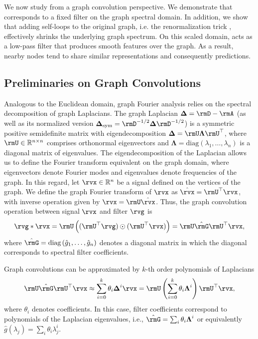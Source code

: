\label{sec:analysis}
We now study \method{} from a graph convolution perspective. We demonstrate that \method{} corresponds to a fixed filter on the graph spectral domain. 
In addition, we show that adding self-loops to the original graph, i.e. the renormalization trick \citep{gcn}, effectively shrinks the underlying graph spectrum.
On this scaled domain, \method{} acts as a low-pass filter that produces smooth features over the graph. As a result, nearby nodes tend to share similar representations and consequently predictions.


\subsection{Preliminaries on Graph Convolutions}
Analogous to the Euclidean domain, graph Fourier analysis relies on the spectral decomposition of graph Laplacians. The graph Laplacian $\boldsymbol{\Delta} = \rmD - \rmA$ (as well as its normalized version $\boldsymbol{\Delta}_{\text{sym}} = \rmD^{-1/2}\boldsymbol{\Delta} \rmD^{-1/2}$) is a symmetric positive semidefinite matrix with eigendecomposition $\boldsymbol{\Delta} = \rmU \boldsymbol{\Lambda} \rmU^{\top}$, where $\rmU \in \mathbb{R}^{n \times n}$ comprises orthonormal eigenvectors and $\boldsymbol{\Lambda} = \text{diag}(\lambda_1, \dots, \lambda_n)$ is a diagonal matrix of eigenvalues. The eigendecomposition of the Laplacian allows us to define the Fourier transform equivalent on the graph domain, where eigenvectors denote Fourier modes and eigenvalues denote frequencies of the graph. In this regard, let $\rvx \in \mathbb{R}^n$ be a signal defined on the vertices of the graph. We define the graph Fourier transform of $\rvx$ as $\hat{\rvx} = \rmU^{\top}\rvx$, with inverse operation given by $\rvx = \rmU \hat{\rvx}$.
Thus, the graph convolution operation between signal $\rvx$ and filter $\rvg$ is
\begin{equation} \label{eq:spectral_conv_definition}
    \rvg * \rvx = \rmU \left( (\rmU^\top \rvg) \odot (\rmU^\top \rvx) \right) = \rmU \hat{\rmG} \rmU^\top \rvx,
\end{equation}
where $\hat{\rmG} = \text{diag}\left(\hat{g}_1, \dots, \hat{g}_n\right)$ denotes a diagonal matrix in which the diagonal corresponds to spectral filter coefficients. 

Graph convolutions can be approximated by $k$-th order polynomials of Laplacians
\begin{equation}
\label{eq:polynomial approximation}
    \rmU\hat{\rmG}\rmU^\top\rvx \approx \sum_{i=0}^{k} \theta_i \boldsymbol{\Delta}^i \rvx = \rmU \left( \sum_{i=0}^{k} \theta_i \boldsymbol{\Lambda}^i \right) \rmU^\top \rvx,
\end{equation}
where $\theta_i$ denotes coefficients. In this case, filter coefficients correspond to polynomials of the Laplacian eigenvalues, i.e., $\hat{\rmG} = \sum_i \theta_i \boldsymbol{\Lambda}^i$ or equivalently $\hat{g}(\lambda_j) = \sum_i \theta_i \lambda_j^i$. 


